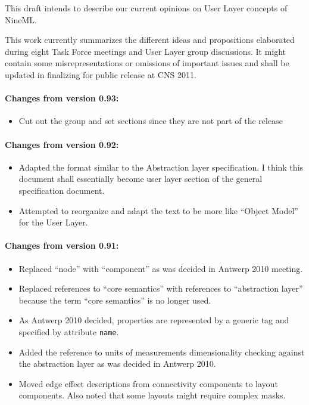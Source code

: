 \documentclass{article}
\begin{document}
\newpage
\pagestyle{plain}

\tableofcontents
\newpage

\abstract
This draft intends to describe our current opinions on User Layer concepts
of NineML.

This work currently summarizes the different ideas and propositions elaborated
during eight Task Force meetings and User Layer group discussions. It might
contain some misrepresentations or omissions of important issues and shall be
updated in finalizing for public release at CNS 2011.

\vskip 1in

\paragraph{Changes from version 0.93:}
\begin{itemize}
\item Cut out the group and set sections since they are not part of the release
\end{itemize}

\paragraph{Changes from version 0.92:}
\begin{itemize}
\item Adapted the format similar to the Abstraction layer specification.
I think this document shall essentially become user layer section of the
general specification document.
\item Attempted to reorganize and adapt the text to be more like ``Object
Model'' for the User Layer.
\end{itemize}

\paragraph{Changes from version 0.91:}
\begin{itemize}
\item Replaced ``node'' with ``component'' as was decided in Antwerp 2010
meeting.
\item Replaced references to ``core semantics'' with references to
``abstraction layer''
because the term ``core semantics'' is no longer used.
\item As Antwerp 2010 decided, properties are represented by a generic
tag and specified
by attribute {\tt name}.
\item Added the reference to units of measurements dimensionality checking
against
the abstraction layer as was decided in Antwerp 2010.
\item Moved edge effect descriptions from connectivity components to layout
components. Also
noted that some layouts might require complex masks.
\end{itemize}
\end{document}
